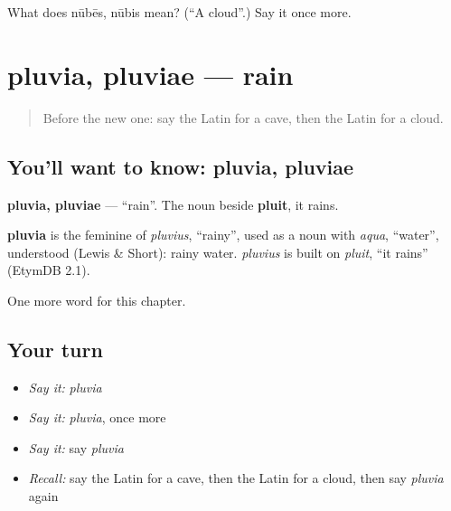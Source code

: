 \begin{tcolorbox}[breakable,colback=teal!4,colframe=teal!35!black,title={Before you move on}]
What does nūbēs, nūbis mean? (\textquotedblleft{}A cloud\textquotedblright{}.) Say it once more.
\end{tcolorbox}
\section[pluvia, pluviae]{pluvia, pluviae — rain}

\label{lesson:LA-C89-pluvia}



\begin{quote}
Before the new one: say the Latin for a cave, then the Latin for a cloud.
\end{quote}

\subsection*{You'll want to know: pluvia, pluviae}
\textbf{pluvia, pluviae} — \textquotedblleft{}rain\textquotedblright{}. The noun beside \textbf{pluit}, it rains.

\begin{cousinweb}
\textbf{pluvia} is the feminine of \emph{pluvius}, \textquotedblleft{}rainy\textquotedblright{}, used as a noun with \emph{aqua}, \textquotedblleft{}water\textquotedblright{}, understood (Lewis \& Short): rainy water. \emph{pluvius} is built on \emph{pluit}, \textquotedblleft{}it rains\textquotedblright{} (EtymDB 2.1).
\end{cousinweb}

\begin{grammarlens}[title={What you've built}]
One more word for this chapter.
\end{grammarlens}

\subsection*{Your turn}
\begin{itemize}
\raggedright
  \item \emph{Say it:} \emph{pluvia}
  \item \emph{Say it:} \emph{pluvia}, once more
  \item \emph{Say it:} say \emph{pluvia}
  \item \emph{Recall:} say the Latin for a cave, then the Latin for a cloud, then say \emph{pluvia} again
\end{itemize}

